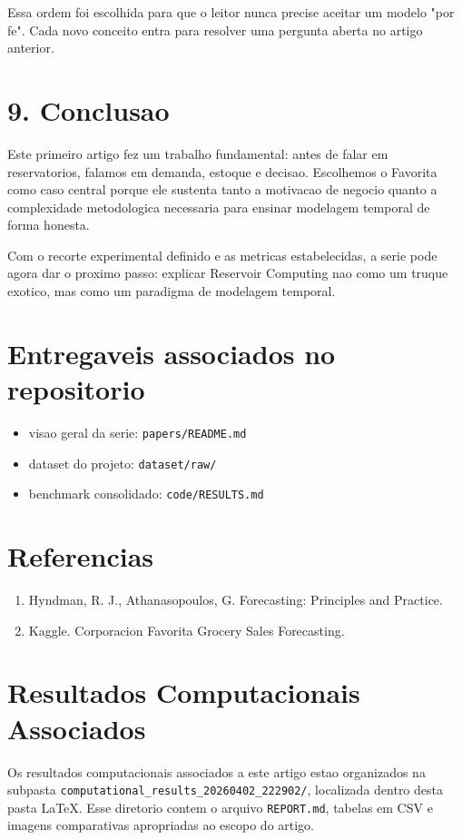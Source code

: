 \documentclass[12pt]{article}
\providecommand{\tightlist}{%
  \setlength{\itemsep}{0pt}\setlength{\parskip}{0pt}}
\begin{document}
Essa ordem foi escolhida para que o leitor nunca precise aceitar um modelo "por fe". Cada novo conceito entra para resolver uma pergunta aberta no artigo anterior.

\section{9. Conclusao}\label{9-conclusao}

Este primeiro artigo fez um trabalho fundamental: antes de falar em reservatorios, falamos em demanda, estoque e decisao. Escolhemos o Favorita como caso central porque ele sustenta tanto a motivacao de negocio quanto a complexidade metodologica necessaria para ensinar modelagem temporal de forma honesta.

Com o recorte experimental definido e as metricas estabelecidas, a serie pode agora dar o proximo passo: explicar Reservoir Computing nao como um truque exotico, mas como um paradigma de modelagem temporal.

\section{Entregaveis associados no repositorio}\label{entregaveis-associados-no-repositorio}

\begin{itemize}
\tightlist
\item
  visao geral da serie: \texttt{papers/README.md}
\item
  dataset do projeto: \texttt{dataset/raw/}
\item
  benchmark consolidado: \texttt{code/RESULTS.md}
\end{itemize}

\section{Referencias}\label{referencias}

\begin{enumerate}
\def\labelenumi{\arabic{enumi}.}
\tightlist
\item
  Hyndman, R. J., Athanasopoulos, G. Forecasting: Principles and Practice.
\item
  Kaggle. Corporacion Favorita Grocery Sales Forecasting.
\end{enumerate}

\section*{Resultados Computacionais Associados}

Os resultados computacionais associados a este artigo estao organizados na subpasta \texttt{computational\_results\_20260402\_222902/}, localizada dentro desta pasta \LaTeX. Esse diretorio contem o arquivo \texttt{REPORT.md}, tabelas em CSV e imagens comparativas apropriadas ao escopo do artigo.
\end{document}
